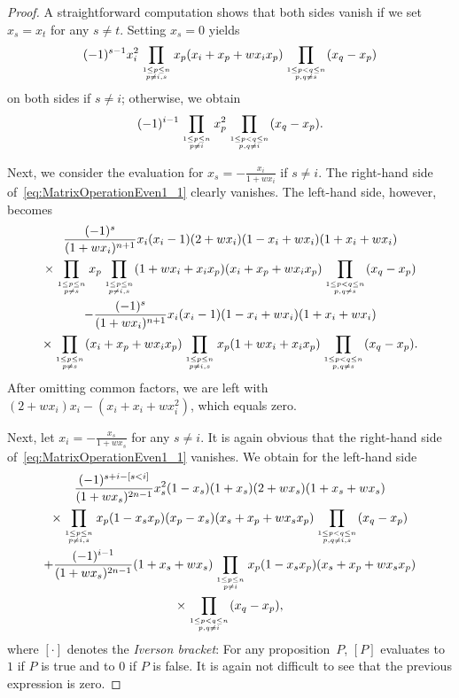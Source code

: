 \documentclass[ALCO, Unicode]{cedram}
\newcommand\myatop[2]{\genfrac{}{}{0pt}{}{#1}{#2}}
\begin{document}
\begin{proof}
		A straightforward computation shows that both sides vanish if we set $x_s=x_t$ for any $s \neq t$. Setting $x_s=0$ yields
		\begin{equation*}
			(-1)^{s-1} x_i^2 \prod_{\myatop{1 \le p \le n}{p \neq i,s}} x_p (x_i+x_p+w x_i x_p) \prod_{\myatop{1 \le p < q \le n}{p,q \neq s}} (x_q - x_p)
		\end{equation*}
		on both sides if $s \neq i$; otherwise, we obtain
		\begin{equation*}
			(-1)^{i-1}  \prod_{\myatop{1 \le p \le n}{p \neq i}} x_p^2 \prod_{\myatop{1 \le p < q \le n}{p,q \neq i}} (x_q - x_p).
		\end{equation*}
		
		Next, we consider the evaluation for $x_s=-\frac{x_i}{1+w x_i}$ if $s \neq i$. The right-hand side of~\eqref{eq:MatrixOperationEven1_1} clearly vanishes. The left-hand side, however, becomes
		\begin{multline*}
			\frac{(-1)^{s}}{(1+w x_i)^{n+1}} x_i (x_i-1)(2+ w x_i)(1-x_i+w x_i)(1+x_i+w x_i)\\
			\times \prod_{\myatop{1 \le p \le n}{p \neq s}} x_p \prod_{\myatop{1 \le p \le n}{p \neq i,s}} (1+w x_i+ x_i x_p)  (x_i+x_p+w x_i x_p) \prod_{\myatop{1 \le p < q \le n}{p,q \neq s}} (x_q - x_p)\\
			- \frac{(-1)^s}{(1+w x_i)^{n+1}} x_i (x_i-1) (1-x_i+w x_i)(1+x_i + w x_i)\\
			\times\prod_{\myatop{1 \le p \le n}{p \neq s}}  (x_i+x_p + w x_i x_p)  \prod_{\myatop{1 \le p \le n}{p \neq i,s}} x_p (1+ w x_i + x_i x_p) \prod_{\myatop{1 \le p <q \le n}{p,q \neq s}} (x_q -x_p).
		\end{multline*}
		After omitting common factors, we are left with $(2+ w x_i) x_i -  (x_i+x_i + w x_i^2)$, which equals zero. 
		
		Next, let $x_i=-\frac{x_s}{1+w x_s}$ for any $s \neq i$. It is again obvious that the right-hand side of~\eqref{eq:MatrixOperationEven1_1} vanishes. We obtain for the left-hand side
		\begin{multline*}
			\frac{(-1)^{s+i-\left[s<i\right]}}{(1+w x_s)^{2n-1}} x_s^2 (1-x_s) (1+x_s) (2+ w x_s)(1+x_s+w x_s)\\
			\times  \prod_{\myatop{1 \le p \le n}{p \neq i,s}}x_p (1-x_s x_p)  (x_p - x_s)  (x_s+x_p+w x_s x_p) \prod_{\myatop{1 \le p < q \le n}{p,q \neq i,s}} (x_q - x_p)\\
			+ \frac{(-1)^{i-1}}{(1+w x_s)^{2n-1}}  (1+x_s + w x_s)\prod_{\myatop{1 \le p \le n}{p \neq i}} x_p (1-x_s x_p) (x_s+x_p+w x_s x_p) \\
			\times \prod_{\myatop{1 \le p <q \le n}{p,q \neq i}} (x_q -x_p),
		\end{multline*}
		where $\left[\boldsymbol{\cdot}\right]$ denotes the \emph{Iverson bracket}: For any proposition~$P$, $\left[P\right]$ evaluates to $1$ if $P$ is true and to $0$ if $P$ is false. It is again not difficult to see that the previous expression is zero.
		

\end{proof}
\end{document}

